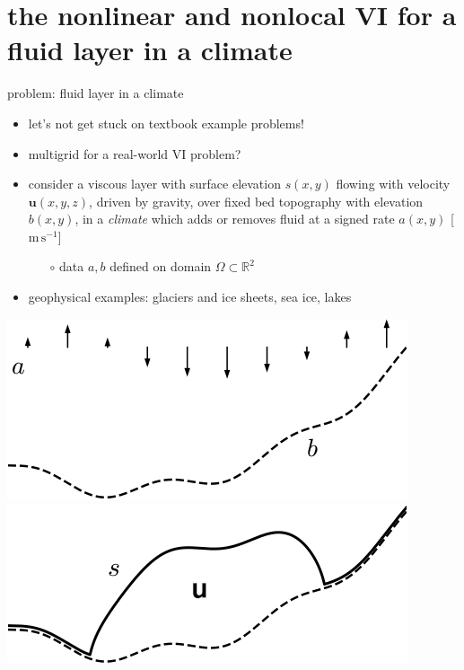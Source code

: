 \documentclass[svgnames,
               hyperref={colorlinks,citecolor=DeepPink4,linkcolor=FireBrick,urlcolor=Maroon},
               usepdftitle=false]  %
               {beamer}
\newcommand{\RR}{\mathbb{R}}
\newcommand{\bu}{\mathbf{u}}
\begin{document}
\section{the nonlinear and nonlocal VI for a fluid layer in a climate}

\begin{frame}{problem: fluid layer in a climate}

\begin{itemize}
\item let's not get stuck on textbook example problems!
\item multigrid for a real-world VI problem?
\item consider a viscous layer with surface elevation $s(x,y)$ flowing with velocity $\bu(x,y,z)$, driven by gravity, over fixed bed topography with elevation $b(x,y)$, in a \emph{climate} which adds or removes fluid at a signed rate $a(x,y)$ [$\text{m}\,\text{s}^{-1}$]
    \begin{itemize}
    \item[$\circ$] data $a,b$ defined on domain $\Omega \subset \RR^2$
    \end{itemize}
\item geophysical examples: \alert{glaciers and ice sheets}, sea ice, lakes
\end{itemize}

\bigskip
\hfill \mbox{\includegraphics[height=0.25\textheight]{images/domain-data.png} \hspace{7mm} \includegraphics[height=0.25\textheight]{images/domain-velocity.png}}
\end{frame}
\end{document}
